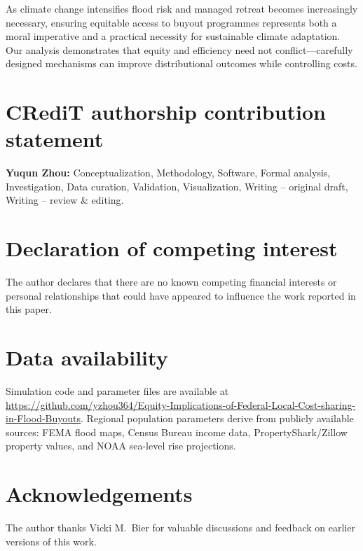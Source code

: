 \documentclass[preprint,12pt,authoryear]{elsarticle}
\begin{document}
As climate change intensifies flood risk and managed retreat becomes increasingly necessary, ensuring equitable access to buyout programmes represents both a moral imperative and a practical necessity for sustainable climate adaptation. Our analysis demonstrates that equity and efficiency need not conflict---carefully designed mechanisms can improve distributional outcomes while controlling costs.


\section*{CRediT authorship contribution statement}

\textbf{Yuqun Zhou:} Conceptualization, Methodology, Software, Formal analysis, Investigation, Data curation, Validation, Visualization, Writing -- original draft, Writing -- review \& editing.

\section*{Declaration of competing interest}

The author declares that there are no known competing financial interests or personal relationships that could have appeared to influence the work reported in this paper.

\section*{Data availability}

Simulation code and parameter files are available at \url{https://github.com/yzhou364/Equity-Implications-of-Federal-Local-Cost-sharing-in-Flood-Buyouts}. Regional population parameters derive from publicly available sources: FEMA flood maps, Census Bureau income data, PropertyShark/Zillow property values, and NOAA sea-level rise projections.

\section*{Acknowledgements}

The author thanks Vicki M.\ Bier for valuable discussions and feedback on earlier versions of this work.

\end{document}
